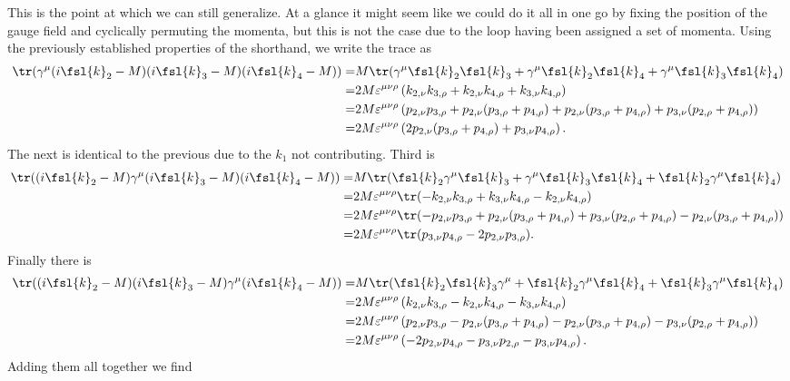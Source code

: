 This is the point at which we can still generalize. At a glance it might seem like we could do it all in one go by fixing the position of the gauge field and cyclically permuting the momenta, but this is not the case due to the loop having been assigned a set of momenta. Using the previously established properties of the shorthand, we write the trace as
\begin{align*}
	\tr(\gamma^{\mu}(i\fsl{k}_{2} - M)(i\fsl{k}_{3} - M)(i\fsl{k}_{4} - M)) =& M\tr(\gamma^{\mu}\fsl{k}_{2}\fsl{k}_{3} + \gamma^{\mu}\fsl{k}_{2}\fsl{k}_{4} + \gamma^{\mu}\fsl{k}_{3}\fsl{k}_{4}) \\
	=& 2M\varepsilon^{\mu\nu\rho}\left(k_{2, \nu}k_{3, \rho} + k_{2, \nu}k_{4, \rho} + k_{3, \nu}k_{4, \rho}\right) \\
	=& 2M\varepsilon^{\mu\nu\rho}\left(p_{2, \nu}p_{3, \rho} + p_{2, \nu}(p_{3, \rho} + p_{4, \rho}) + p_{2, \nu}(p_{3, \rho} + p_{4, \rho}) + p_{3, \nu}(p_{2, \rho} + p_{4, \rho})\right) \\
	=& 2M\varepsilon^{\mu\nu\rho}\left(2p_{2, \nu}(p_{3, \rho} + p_{4, \rho}) + p_{3, \nu}p_{4, \rho}\right).
\end{align*}
The next is identical to the previous due to the $k_{1}$ not contributing. Third is
\begin{align*}
	\tr((i\fsl{k}_{2} - M)\gamma^{\mu}(i\fsl{k}_{3} - M)(i\fsl{k}_{4} - M)) =& M\tr(\fsl{k}_{2}\gamma^{\mu}\fsl{k}_{3} + \gamma^{\mu}\fsl{k}_{3}\fsl{k}_{4} + \fsl{k}_{2}\gamma^{\mu}\fsl{k}_{4}) \\
	=& 2M\varepsilon^{\mu\nu\rho}\tr(-k_{2, \nu}k_{3, \rho} + k_{3, \nu}k_{4, \rho} - k_{2, \nu}k_{4, \rho}) \\
	=& 2M\varepsilon^{\mu\nu\rho}\tr(-p_{2, \nu}p_{3, \rho} + p_{2, \nu}(p_{3, \rho} + p_{4, \rho}) + p_{3, \nu}(p_{2, \rho} + p_{4, \rho}) - p_{2, \nu}(p_{3, \rho} + p_{4, \rho})) \\
	=& 2M\varepsilon^{\mu\nu\rho}\tr(p_{3, \nu}p_{4, \rho} - 2p_{2, \nu}p_{3, \rho}).
\end{align*}
Finally there is
\begin{align*}
	\tr((i\fsl{k}_{2} - M)(i\fsl{k}_{3} - M)\gamma^{\mu}(i\fsl{k}_{4} - M)) =& M\tr(\fsl{k}_{2}\fsl{k}_{3}\gamma^{\mu} + \fsl{k}_{2}\gamma^{\mu}\fsl{k}_{4} + \fsl{k}_{3}\gamma^{\mu}\fsl{k}_{4}) \\
	=& 2M\varepsilon^{\mu\nu\rho}\left(k_{2, \nu}k_{3, \rho} - k_{2, \nu}k_{4, \rho} - k_{3, \nu}k_{4, \rho}\right) \\
	=& 2M\varepsilon^{\mu\nu\rho}\left(p_{2, \nu}p_{3, \rho} - p_{2, \nu}(p_{3, \rho} + p_{4, \rho}) - p_{2, \nu}(p_{3, \rho} + p_{4, \rho}) - p_{3, \nu}(p_{2, \rho} + p_{4, \rho})\right) \\
	=& 2M\varepsilon^{\mu\nu\rho}\left(-2p_{2, \nu}p_{4, \rho} - p_{3, \nu}p_{2, \rho} - p_{3, \nu}p_{4, \rho}\right).
\end{align*}
Adding them all together we find

